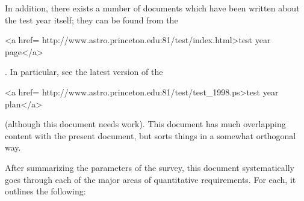 In addition, there exists a number of documents which have been written
about the test year itself; they can be found from the 
\begin{rawhtml}
<a href= 
http://www.astro.princeton.edu:81/test/index.html>test year page</a>\end{rawhtml}.  In particular,
see the latest version of the 
\begin{rawhtml}
<a href=
http://www.astro.princeton.edu:81/test/test_1998.ps>test
year plan</a>\end{rawhtml} (although this
document needs work).  This document
has much overlapping content with the present document, but sorts things
in a somewhat orthogonal way.  

  After summarizing the parameters of the survey, this document
systematically goes through each of the major areas of quantitative
requirements.  For each, it outlines the following:

